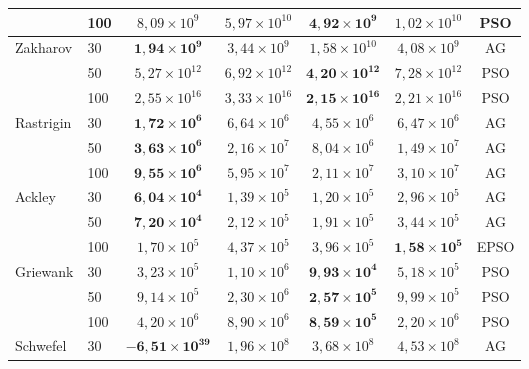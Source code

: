 \documentclass[runningheads]{llncs}
\begin{document}
\begin{table}[H]
\begin{tabular}{llccccc}
  & 100 & $8{,}09{\times}10^{9}$ & $5{,}97{\times}10^{10}$ & \cellcolor{green!20}$\mathbf{4{,}92{\times}10^{9}}$ & $1{,}02{\times}10^{10}$ & PSO \\
\midrule
\multirow{3}{*}{Zakharov}
  & 30  & \cellcolor{green!20}$\mathbf{1{,}94{\times}10^{9}}$ & $3{,}44{\times}10^{9}$ & $1{,}58{\times}10^{10}$ & $4{,}08{\times}10^{9}$ & AG \\
  & 50  & $5{,}27{\times}10^{12}$ & $6{,}92{\times}10^{12}$ & \cellcolor{green!20}$\mathbf{4{,}20{\times}10^{12}}$ & $7{,}28{\times}10^{12}$ & PSO \\
  & 100 & $2{,}55{\times}10^{16}$ & $3{,}33{\times}10^{16}$ & \cellcolor{green!20}$\mathbf{2{,}15{\times}10^{16}}$ & $2{,}21{\times}10^{16}$ & PSO \\
\midrule
\multirow{3}{*}{Rastrigin}
  & 30  & \cellcolor{green!20}$\mathbf{1{,}72{\times}10^{6}}$ & $6{,}64{\times}10^{6}$ & $4{,}55{\times}10^{6}$ & $6{,}47{\times}10^{6}$ & AG \\
  & 50  & \cellcolor{green!20}$\mathbf{3{,}63{\times}10^{6}}$ & $2{,}16{\times}10^{7}$ & $8{,}04{\times}10^{6}$ & $1{,}49{\times}10^{7}$ & AG \\
  & 100 & \cellcolor{green!20}$\mathbf{9{,}55{\times}10^{6}}$ & $5{,}95{\times}10^{7}$ & $2{,}11{\times}10^{7}$ & $3{,}10{\times}10^{7}$ & AG \\
\midrule
\multirow{3}{*}{Ackley}
  & 30  & \cellcolor{green!20}$\mathbf{6{,}04{\times}10^{4}}$ & $1{,}39{\times}10^{5}$ & $1{,}20{\times}10^{5}$ & $2{,}96{\times}10^{5}$ & AG \\
  & 50  & \cellcolor{green!20}$\mathbf{7{,}20{\times}10^{4}}$ & $2{,}12{\times}10^{5}$ & $1{,}91{\times}10^{5}$ & $3{,}44{\times}10^{5}$ & AG \\
  & 100 & $1{,}70{\times}10^{5}$ & $4{,}37{\times}10^{5}$ & $3{,}96{\times}10^{5}$ & \cellcolor{green!20}$\mathbf{1{,}58{\times}10^{5}}$ & EPSO \\
\midrule
\multirow{3}{*}{Griewank}
  & 30  & $3{,}23{\times}10^{5}$ & $1{,}10{\times}10^{6}$ & \cellcolor{green!20}$\mathbf{9{,}93{\times}10^{4}}$ & $5{,}18{\times}10^{5}$ & PSO \\
  & 50  & $9{,}14{\times}10^{5}$ & $2{,}30{\times}10^{6}$ & \cellcolor{green!20}$\mathbf{2{,}57{\times}10^{5}}$ & $9{,}99{\times}10^{5}$ & PSO \\
  & 100 & $4{,}20{\times}10^{6}$ & $8{,}90{\times}10^{6}$ & \cellcolor{green!20}$\mathbf{8{,}59{\times}10^{5}}$ & $2{,}20{\times}10^{6}$ & PSO \\
\midrule
\multirow{3}{*}{Schwefel}
  & 30  & \cellcolor{green!20}$\mathbf{-6{,}51{\times}10^{39}}$ & $1{,}96{\times}10^{8}$ & $3{,}68{\times}10^{8}$ & $4{,}53{\times}10^{8}$ & AG \\

\end{tabular}
\end{table}
\end{document}
